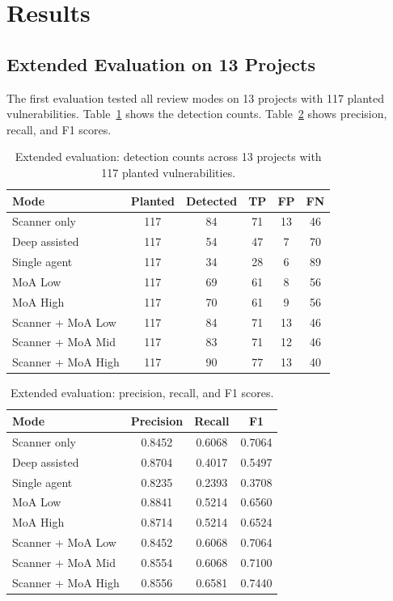 \documentclass[sigconf,nonacm]{acmart}
\begin{document}
\section{Results}
\subsection{Extended Evaluation on 13 Projects}

The first evaluation tested all review modes on 13 projects with 117 planted vulnerabilities. Table~\ref{tab:extended-results} shows the detection counts. Table~\ref{tab:extended-metrics} shows precision, recall, and F1 scores.

\begin{table}
  \caption{Extended evaluation: detection counts across 13 projects with 117 planted vulnerabilities.}
  \label{tab:extended-results}
  \centering
  \small
  \begin{tabular}{lccccc}
    \toprule
    Mode & Planted & Detected & TP & FP & FN \\
    \midrule
    Scanner only & 117 & 84 & 71 & 13 & 46 \\
    Deep assisted & 117 & 54 & 47 & 7 & 70 \\
    Single agent & 117 & 34 & 28 & 6 & 89 \\
    MoA Low & 117 & 69 & 61 & 8 & 56 \\
    MoA High & 117 & 70 & 61 & 9 & 56 \\
    Scanner + MoA Low & 117 & 84 & 71 & 13 & 46 \\
    Scanner + MoA Mid & 117 & 83 & 71 & 12 & 46 \\
    Scanner + MoA High & 117 & 90 & 77 & 13 & 40 \\
    \bottomrule
  \end{tabular}
\end{table}

\begin{table}
  \caption{Extended evaluation: precision, recall, and F1 scores.}
  \label{tab:extended-metrics}
  \centering
  \small
  \begin{tabular}{lccc}
    \toprule
    Mode & Precision & Recall & F1 \\
    \midrule
    Scanner only & 0.8452 & 0.6068 & 0.7064 \\
    Deep assisted & 0.8704 & 0.4017 & 0.5497 \\
    Single agent & 0.8235 & 0.2393 & 0.3708 \\
    MoA Low & 0.8841 & 0.5214 & 0.6560 \\
    MoA High & 0.8714 & 0.5214 & 0.6524 \\
    Scanner + MoA Low & 0.8452 & 0.6068 & 0.7064 \\
    Scanner + MoA Mid & 0.8554 & 0.6068 & 0.7100 \\
    Scanner + MoA High & 0.8556 & 0.6581 & 0.7440 \\
    \bottomrule
  \end{tabular}
\end{table}
\end{document}
